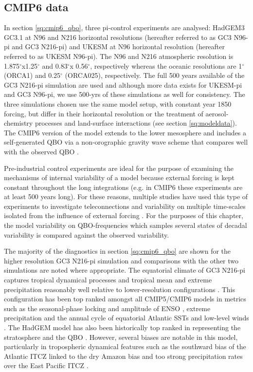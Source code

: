 \subsection{CMIP6 data}
In section \ref{sq:cmip6_qbo}, three pi-control experiments are analysed: HadGEM3 GC3.1 at N96 and N216 horizontal resolutions (hereafter referred to as GC3 N96-pi and GC3 N216-pi) and UKESM at N96 horizontal resolution (hereafter referred to as UKESM N96-pi). The N96 and N216 atmospheric resolution is 1.875$^\circ$x1.25$^\circ$ and 0.83$^\circ$x 0.56$^\circ$, respectively whereas the oceanic resolutions are 1$^\circ$ (ORCA1) and 0.25$^\circ$  (ORCA025), respectively. The full 500 years available of the GC3 N216-pi simulation are used and although more data exists for UKESM-pi and GC3 N96-pi, we use 500-yrs of these simulations as well for consistency. 
The three simulations chosen use the same model setup, with constant year 1850 forcing, but differ in their horizontal resolution or the treatment of aerosol-chemistry processes and land-surface interactions (see section \ref{sq:modeldata}). 
 The CMIP6 version of the model extends to the lower mesosphere and includes a self-generated QBO via a non-orographic gravity wave scheme that compares well with the observed QBO \citep{richter2020}. 

Pre-industrial control experiments are ideal for the purpose of examining the mechanisms of internal variability of a model because external forcing is kept constant throughout the long integrations (e.g. in CMIP6 these experiments are at least 500 years long). For these reasons, multiple studies have used this type of experiments to investigate teleconnections and variability on multiple time-scales isolated from the influence of external forcing \citep[see e.g.][]{watanabe2012uncertainty,zanchettin2014,palmer2014internal,menary2018,dimdore2021,villamayor2021causes}. For the purposes of this chapter, the model variability on QBO-frequencies which samples several states of decadal variability is compared against the observed variability. 

The majority of the diagnostics in section \ref{sq:cmip6_qbo} are shown for the higher resolution GC3 N216-pi simulation and comparisons with the other two simulations are noted where appropriate. The equatorial climate of GC3 N216-pi  captures tropical dynamical processes and tropical mean and extreme precipitation reasonably well relative to lower-resolution configurations \citep[Chapter \ref{ch:4-ams}, ][]{garciafranco2020,abdelmoaty2021biases}. This configuration has been top ranked amongst all CMIP5/CMIP6 models in metrics such as the seasonal-phase locking and amplitude of ENSO \citep{menary2018,richter2020overview,liu2021enso}, extreme precipitation \citep{abdelmoaty2021biases} and the annual cycle of equatorial Atlantic SSTs and low-level winds \citep{richter2020overview}. 
  The HadGEM model has also been historically top ranked in representing the stratosphere and the QBO \citep{schenzinger2017,richter2020}.
  However, several biases are notable in this model, particularly in tropospheric dynamical features such as the southward bias of the Atlantic ITCZ linked to the dry Amazon bias and too strong precipitation rates over the East Pacific ITCZ \citep{garciafranco2020}.


